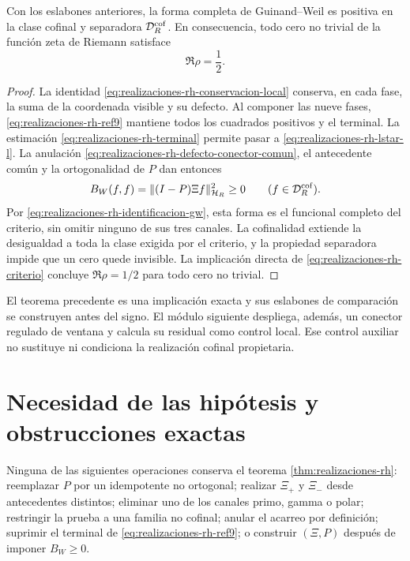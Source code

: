 \begin{theorem}
\label{thm:realizaciones-rh}
Con los eslabones anteriores, la forma completa de Guinand--Weil es positiva
en la clase cofinal y separadora \(\mathcal D_R^{\rm cof}\). En consecuencia,
todo cero no trivial de la función zeta de Riemann satisface
\[
 \Re\rho=\frac12.
\]
\end{theorem}

\begin{proof}
La identidad \eqref{eq:realizaciones-rh-conservacion-local} conserva, en
cada fase, la suma de la coordenada visible y su defecto. Al componer las
nueve fases, \eqref{eq:realizaciones-rh-ref9} mantiene todos los cuadrados
positivos y el terminal. La estimación
\eqref{eq:realizaciones-rh-terminal} permite pasar a
\eqref{eq:realizaciones-rh-lstar-l}. La anulación
\eqref{eq:realizaciones-rh-defecto-conector-comun}, el antecedente común y la
ortogonalidad de \(P\) dan entonces
\[
 B_W(f,f)=\|(I-P)\Xi f\|_{\mathcal H_R}^{2}\geq0
 \qquad(f\in\mathcal D_R^{\rm cof}).
\]
Por \eqref{eq:realizaciones-rh-identificacion-gw}, esta forma es el
funcional completo del criterio, sin omitir ninguno de sus tres canales. La
cofinalidad extiende la desigualdad a toda la clase exigida por el criterio,
y la propiedad separadora impide que un cero quede invisible. La implicación
directa de \eqref{eq:realizaciones-rh-criterio} concluye
\(\Re\rho=1/2\) para todo cero no trivial.
\end{proof}

El teorema precedente es una implicación exacta y sus eslabones de
comparación se construyen antes del signo. El módulo siguiente despliega,
además, un conector regulado de ventana y calcula su residual como control
local. Ese control auxiliar no sustituye ni condiciona la realización
cofinal propietaria.



\section*{Necesidad de las hipótesis y obstrucciones exactas}

\begin{ablation}
\label{abl:realizaciones-rh}
Ninguna de las siguientes operaciones conserva el teorema
\ref{thm:realizaciones-rh}: reemplazar \(P\) por un idempotente no
ortogonal; realizar \(\Xi_+\) y \(\Xi_-\) desde antecedentes distintos;
eliminar uno de los canales primo, gamma o polar; restringir la prueba a una
familia no cofinal; anular el acarreo por definición; suprimir el terminal de
\eqref{eq:realizaciones-rh-ref9}; o construir \((\Xi,P)\) después de imponer
\(B_W\geq0\).
\end{ablation}

